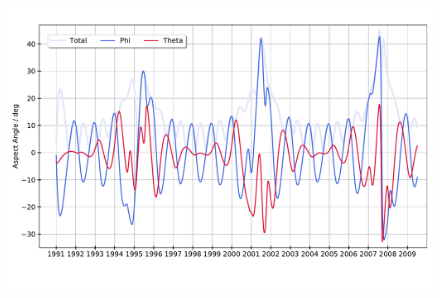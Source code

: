 \documentclass{beamer}
\begin{document}
\begin{frame}{}
\begin{figure}
	\includegraphics[scale=0.3]{Pics/aa_new.pdf}
\end{figure}
\end{frame}

\end{document}
